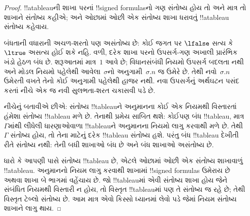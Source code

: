 \documentclass[../../../include/open-logic-section]{subfiles}
\begin{document}
\begin{proof}
!!a{tableau}ની શાખા પરનાં !!{signed formula}sનો ગણ સંતોષ્ય હોય
તો અને માત્ર તો શાખાને સંતોષ્ય કહીએ; અને ઓછામાં ઓછી એક સંતોષ્ય
શાખા ધરાવતું !!a{tableau} સંતોષ્ય કહેવાય.

બંધતાની વધારાની અચળ-શરતો પણ અસંતોષ્ય છે:
કોઈ જગત પર $\lfalse$ સત્ય કે $\ltrue$ અસત્ય હોઈ શકે નહિ.
વળી, દરેક શાખા પરનો ઉપસર્ગ-ગણ અખાલી પ્રારંભિક ખંડો હેઠળ
બંધ છે. શરૂઆતમાં માત્ર~$1$ આવે છે; વિધાનસંબંધી નિયમો
ઉપસર્ગ બદલતા નથી અને મોડલ નિયમો પહેલેથી આવેલા~$\sigma$નો
અનુગામી~$\sigma.n$ જ ઉમેરે છે. તેથી નવો~$\sigma.n$
ઉમેરતી વખતે તેનો કોઈ અનુગામી પહેલેથી હાજર નથી. નવા
ઉપસર્ગનું અર્થઘટન પસંદ કરતાં નીચે એક જ નવી સુલભતા-શરત
ચકાસવી પડે છે.

નીચેનું બતાવીએ છીએ: સંતોષ્ય !!{tableau}ને અનુમાનના કોઈ એક નિયમથી
વિસ્તારતાં હંમેશા સંતોષ્ય !!{tableau} મળે છે. તેનાથી પ્રમેય
સાબિત થશે: કોઈપણ બંધ !!{tableau}, માત્ર~$\Gamma$માંથી લીધેલી
ધારણાઓવાળા !!{tableau}ને અનુમાનના નિયમો લાગુ કરવાથી મળે છે.
તેથી $\Gamma$ સંતોષ્ય હોય, તો તેના માટેનું દરેક !!{tableau}
સંતોષ્ય હશે. પરંતુ બંધ !!{tableau} દેખીતી રીતે સંતોષ્ય નથી:
તેની બધી શાખાઓ બંધ છે અને બંધ શાખાઓ અસંતોષ્ય છે.

ધારો કે આપણી પાસે સંતોષ્ય !!{tableau} છે, એટલે ઓછામાં ઓછી એક
સંતોષ્ય શાખાવાળું !!a{tableau}. અનુમાનનો નિયમ લાગુ કરવાથી
શાખામાં !!{signed formula}s ઉમેરાય છે અથવા શાખા બે ભાગમાં
વહેંચાય છે. જો !!{tableau}માં એવી સંતોષ્ય શાખા હોય જેને સંબંધિત
નિયમથી વિસ્તારી ન હોય, તો વિસ્તૃત !!{tableau}માં પણ તે
સંતોષ્ય જ રહે છે; તેથી વિસ્તૃત ટેબ્લો સંતોષ્ય છે. આમ માત્ર એવો
કિસ્સો ધ્યાનમાં લેવો પડે જેમાં નિયમ સંતોષ્ય શાખાને લાગુ થાય.


\end{proof}
\end{document}
